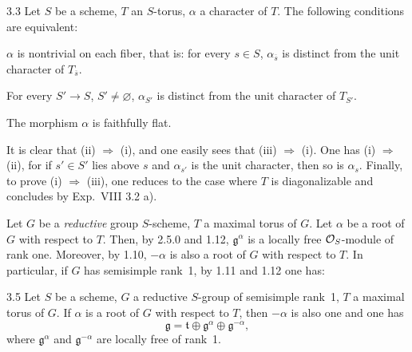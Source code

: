 \begin{lemma}{3.3}\label{XIX.3.3}
Let $S$ be a scheme, $T$ an $S$-torus, $\alpha$ a character of $T$. The following conditions are equivalent:
\begin{enumeratei}
\item $\alpha$ is nontrivial on each fiber, that is: for every $s\in S$, $\alpha_{\overline{s}}$ is distinct from the unit character of $T_{\overline{s}}$.
\item For every $S'\to S$, $S'\ne\varnothing$, $\alpha_{S'}$ is distinct from the unit character of $T_{S'}$.
\item The morphism $\alpha$ is faithfully flat.
\end{enumeratei}
\end{lemma}
{\renewcommand{\thefootnote}{(29)}}%
It is clear that (ii) $\Rightarrow$ (i), and one easily sees that (iii) $\Rightarrow$ (i). One has (i) $\Rightarrow$ (ii), for if $s'\in S'$ lies above $s$ and $\alpha_{s'}$ is the unit character, then so is $\alpha_s$. Finally, to prove (i) $\Rightarrow$ (iii), one reduces to the case where $T$ is diagonalizable and concludes by Exp.~VIII 3.2 a).

 {\renewcommand{\thefootnote}{(30)}}%
Let $G$ be a \emph{reductive} group $S$-scheme, $T$ a maximal torus of $G$. Let $\alpha$ be a root of $G$ with respect to $T$. Then, by 2.5.0 and 1.12, $\mathfrak g^\alpha$ is a locally free $\mathcal{O}_S$-module of rank one. Moreover, by 1.10, $-\alpha$ is also a root of $G$ with respect to $T$. In particular, if $G$ has semisimple rank~1, by 1.11 and 1.12 one has:

\begin{lemma}{3.5}\label{XIX.3.5}
Let $S$ be a scheme, $G$ a reductive $S$-group of semisimple rank~1, $T$ a maximal torus of $G$. If $\alpha$ is a root of $G$ with respect to $T$, then $-\alpha$ is also one and one has
\[
\mathfrak g=\mathfrak t\oplus\mathfrak g^\alpha\oplus\mathfrak g^{-\alpha},
\]
where $\mathfrak g^\alpha$ and $\mathfrak g^{-\alpha}$ are locally free of rank~1.
\end{lemma}

